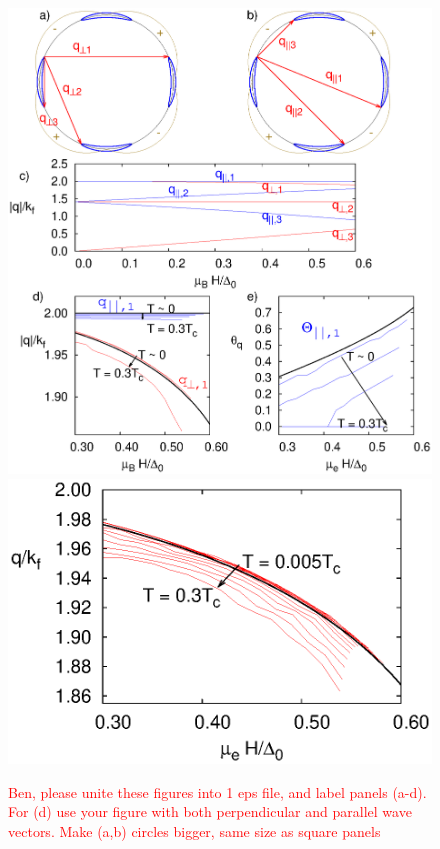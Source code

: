 \documentclass[aps,prl,twocolumn,showpacs,amsmath,amssymb]{revtex4-1}
\newcommand{\red}{\textcolor{red}}
\begin{document}
%
\begin{figure}[t]
\includegraphics[width=0.95\linewidth]{Fig2.eps}
\includegraphics[width=0.75\linewidth]{Fig2d.eps}
\caption{ 
	\label{fig:qq} 
	\red{Ben, please unite these figures into 1 eps file, and label panels (a-d). For (d) use your figure with 
	both perpendicular and parallel wave vectors. Make (a,b) circles bigger, same size as square panels 
}}
\end{figure}
\end{document}
